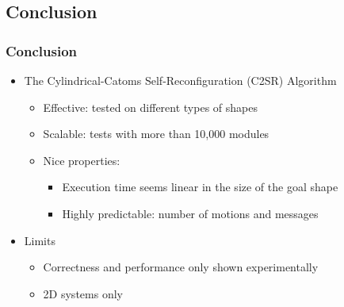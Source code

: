 \subsection{Conclusion}

\begin{frame}
\frametitle{Conclusion}
\begin{itemize}
	\item The Cylindrical-Catoms Self-Reconfiguration (C2SR) Algorithm
	\begin{itemize}
		\item Effective: tested on different types of shapes
		\item Scalable: tests with more than 10,000 modules
		\item Nice properties:
		\begin{itemize}
			\item Execution time seems linear in the size of the goal shape
			\item Highly predictable: number of motions and messages
		\end{itemize}
	\end{itemize}
	\item Limits
	\begin{itemize}
		\item Correctness and performance only shown experimentally
		\item 2D systems only
	\end{itemize}
\end{itemize}
\end{frame}